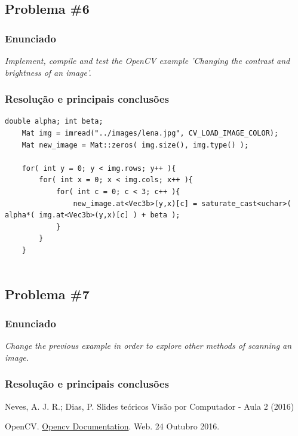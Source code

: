 \documentclass[portuguese, times, mirror]{revdetua}
\begin{document}
\subsection{Problema \#6}

\subsubsection{Enunciado}
\textit{ Implement, compile and test the OpenCV example 'Changing the contrast and brightness of an image'.}

\subsubsection{Resolução e principais conclusões}




\begin{lstlisting}[caption=Proposta de resolução do exercício 6,label=code:C]
    double alpha; int beta;
    Mat img = imread("../images/lena.jpg", CV_LOAD_IMAGE_COLOR);
    Mat new_image = Mat::zeros( img.size(), img.type() );
    
    for( int y = 0; y < img.rows; y++ ){
        for( int x = 0; x < img.cols; x++ ){
            for( int c = 0; c < 3; c++ ){
                new_image.at<Vec3b>(y,x)[c] = saturate_cast<uchar>( alpha*( img.at<Vec3b>(y,x)[c] ) + beta );
            }
        }
    }
    
\end{lstlisting}


\subsection{Problema \#7}

\subsubsection{Enunciado}
\textit{ Change the previous example in order to explore other methods of scanning an image.}

\subsubsection{Resolução e principais conclusões}




\begin{thebibliography}{1} %



Neves, A. J. R.; Dias, P. Slides teóricos Visão por Computador - Aula 2 (2016)


OpenCV. \href{hhttp://docs.opencv.org/}{Opencv Documentation}. Web. 24 Outubro 2016. 




\end{thebibliography}
\end{document}

